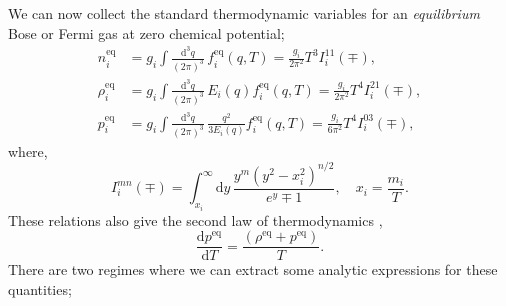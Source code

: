 \documentclass[11pt]{article}
\numberwithin{equation}{section}
\numberwithin{figure}{section}
\numberwithin{table}{section}
\begin{document}
We can now collect the standard thermodynamic variables for an \textit{equilibrium} Bose or Fermi gas at zero chemical potential;
\begin{align}
n_i^{\mathrm{eq}} &= g_i \int{\frac{\mathrm{d}^3 q}{(2\pi)^3} \, f_i^{\mathrm{eq}}(q, T)} = \frac{g_i}{2\pi^2}T^3 I_{i}^{11}(\mp), \label{eq:neq}\\
\rho_i^{\mathrm{eq}} &= g_i \int{\frac{\mathrm{d}^3 q}{(2\pi)^3} \, E_i(q) f_i^{\mathrm{eq}}(q, T)} = \frac{g_i}{2\pi^2}T^4 I_{i}^{21}(\mp), \label{eq:req}\\
p_i^{\mathrm{eq}} &= g_i \int{\frac{\mathrm{d}^3 q}{(2\pi)^3} \, \frac{q^2}{3E_i(q)}f_i^{\mathrm{eq}}(q, T)} = \frac{g_i}{6\pi^2}T^4 I_{i}^{03}(\mp), \label{eq:peq}
\end{align}
where,
\begin{equation}
I_i^{mn}(\mp) = \int_{x_i}^{\infty}{\mathrm{d}y\,\frac{y^m(y^2 - x_i^2)^{n/2}}{e^y \mp 1}}, \quad x_i = \frac{m_i}{T}.
\end{equation}
These relations also give the second law of thermodynamics \citep{Weinberg:1972kfs},
\begin{equation}
\frac{\mathrm{d}p^{\mathrm{eq}}}{\mathrm{d}T} = \frac{(\rho^{\mathrm{eq}} + p^{\mathrm{eq}})}{T}.
\end{equation}
There are two regimes where we can extract some analytic expressions for these quantities;
\end{document}
